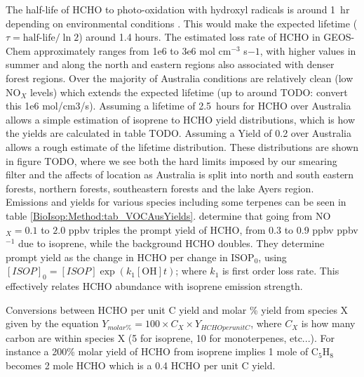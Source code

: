     The half-life of HCHO to photo-oxidation with hydroxyl radicals is around 1~hr depending on environmental conditions \parencite{WHO_hcho_guidelines_2010}.
    This would make the expected lifetime ($\tau = \text{half-life}/\ln{2}$) around 1.4 hours.
    The estimated loss rate of HCHO in GEOS-Chem approximately ranges from 1e6 to 3e6 mol cm$^{-3}$ s${-1}$, with higher values in summer and along the north and eastern regions also associated with denser forest regions.
    Over the majority of Australia conditions are relatively clean (low NO$_X$ levels) which extends the expected lifetime (up to around TODO: convert this  1e6 mol/cm3/s).
    Assuming a lifetime of 2.5~hours for HCHO over Australia allows a simple estimation of isoprene to HCHO yield distributions, which is how the yields are calculated in table TODO.
    Assuming a Yield of 0.2 over Australia allows a rough estimate of the lifetime distribution.
    These distributions are shown in figure TODO, where we see both the hard limits imposed by our smearing filter and the affects of location as Australia is split into north and south eastern forests, northern forests, southeastern forests and the lake Ayers region.
    Emissions and yields for various species including some terpenes can be seen in table \ref{BioIsop:Method:tab_VOCAusYields}.
    \textcite{Wolfe2016} determine that going from NO$_X = 0.1$ to $2.0$ ppbv triples the prompt yield of HCHO, from 0.3 to 0.9 ppbv ppbv$^{-1}$ due to isoprene, while the background HCHO doubles.
    They determine prompt yield as the change in HCHO per change in ISOP$_0$, using $[ISOP]_0=[ISOP]\exp(k_1[\mathrm{OH}]t)$; where $k_1$ is first order loss rate.
    This effectively relates HCHO abundance with isoprene emission strength.
        
    Conversions between HCHO per unit C yield and molar \% yield from species X given by the equation $ Y_{molar \%} = 100 \times C_X \times Y_{HCHO per unit C} $, where $C_X$ is how many carbon are within species X (5 for isoprene, 10 for monoterpenes, etc...).
    For instance a 200\% molar yield of HCHO from isoprene implies 1 mole of C$_5$H$_8$ becomes 2 mole HCHO which is a 0.4 HCHO per unit C yield.
    
